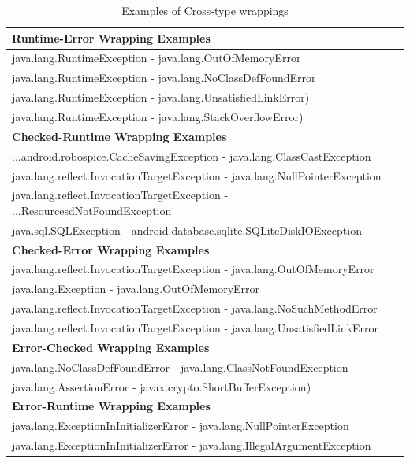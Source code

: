\documentclass[conference]{IEEEtran}
\begin{document}
\begin{table}
\centering

\begin{tabular}{ll}
    \hline
 \bfseries{Runtime-Error Wrapping Examples} &   \\  %
    \hline
java.lang.RuntimeException - java.lang.OutOfMemoryError & \\ %
java.lang.RuntimeException - java.lang.NoClassDefFoundError &\\ %
java.lang.RuntimeException - java.lang.UnsatisfiedLinkError) & \\ %
java.lang.RuntimeException -  java.lang.StackOverflowError)  & \\ %
\hline
\bfseries{Checked-Runtime Wrapping Examples} &  \\
 \hline
...android.robospice.CacheSavingException - java.lang.ClassCastException &  \\ %
java.lang.reflect.InvocationTargetException - java.lang.NullPointerException &   \\ %
java.lang.reflect.InvocationTargetException - ...ResourcesdNotFoundException &  \\ %
java.sql.SQLException - android.database.sqlite.SQLiteDiskIOException &  \\ %
 \hline
\bfseries{Checked-Error Wrapping Examples} & \\
 \hline
java.lang.reflect.InvocationTargetException - java.lang.OutOfMemoryError &  \\ %
java.lang.Exception - java.lang.OutOfMemoryError &  \\ %
java.lang.reflect.InvocationTargetException - java.lang.NoSuchMethodError &	 \\ %
java.lang.reflect.InvocationTargetException - java.lang.UnsatisfiedLinkError&	 \\ %
\hline
\bfseries{Error-Checked Wrapping Examples} & \\
 \hline
java.lang.NoClassDefFoundError - java.lang.ClassNotFoundException &  \\ %
java.lang.AssertionError - javax.crypto.ShortBufferException) &  \\ %
\hline
\bfseries{Error-Runtime Wrapping Examples} &   \\
 \hline
java.lang.ExceptionInInitializerError - java.lang.NullPointerException &  \\ %
java.lang.ExceptionInInitializerError - java.lang.IllegalArgumentException &	 \\ %
 \hline
  \end{tabular}
\caption{Examples of Cross-type wrappings}
\label{tab:wrapping01}
\end{table}
\end{document}
